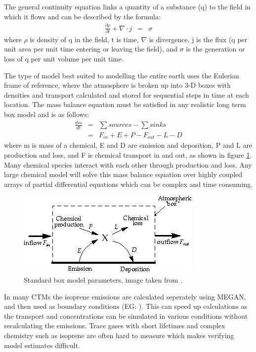   The general continuity equation links a quantity of a substance (q) to the field in which it flows and can be described by the formula:
  \begin{eqnarray*}
    \frac{\partial \rho}{\partial t} + \nabla \cdot j &=& \sigma 
  \end{eqnarray*}
  where $\rho$ is density of q in the field, t is time, $\nabla$ is divergence, j is the flux (q per unit area per unit time entering or leaving the field), and $\sigma$ is the generation or loss of q per unit volume per unit time.
  
  
  The type of model best suited to modelling the entire earth uses the Eulerian frame of reference, where the atmosphere is broken up into 3-D boxes with densities and transport calculated and stored for sequential steps in time at each location.
  The mass balance equation must be satisfied in any realistic long term box model and is as follows: 
  \begin{align*}
    \frac{dm}{dt} &=& \sum{sources}-\sum{sinks} \\
    &=& F_{in} + E + P - F_{out} - L - D 
  \end{align*}
  where m is mass of a chemical, E and D are emission and deposition, P and L are production and loss, and F is chemical transport in and out, as shown in figure \ref{LR:Models:fig_boxmodel}.
  Many chemical species interact with each other through production and loss. 
  Any large chemical model will solve this mass balance equation over highly coupled arrays of partial differential equations which can be complex and time consuming.
  
  \begin{figure}
    \includegraphics{Figures/boxmodel.png}
    \caption{ %
      Standard box model parameters, image taken from \cite{Jacob_1999_book}. }
    \label{LR:Models:fig_boxmodel}
  \end{figure}
  
  In many CTMs the isoprene emissions are calculated seperately using MEGAN, and then used as boundary conditions (EG: \cite{Guenther2006}). 
  This can speed up calculations as the transport and concentrations can be simulated in various conditions without recalculating the emissions.
  Trace gases with short lifetimes and complex chemistry such as isoprene are often hard to measure which makes verifying model estimates difficult.
  

